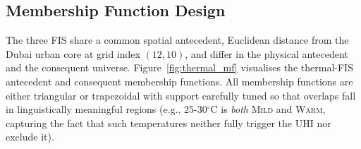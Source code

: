 \documentclass[conference]{IEEEtran}
\begin{document}
\subsection{Membership Function Design}
\label{sec:mf_design}

The three FIS share a common spatial antecedent, Euclidean distance from the Dubai urban core at grid index \((12,10)\), and differ in the physical antecedent and the consequent universe.
Figure~\ref{fig:thermal_mf} visualises the thermal-FIS antecedent and
consequent membership functions.  All membership functions are either
triangular or trapezoidal with support carefully tuned so that overlaps
fall in linguistically meaningful regions (e.g., 25-30\(^{\circ}\)C is
\emph{both} \textsc{Mild} and \textsc{Warm}, capturing the fact that such
temperatures neither fully trigger the UHI nor exclude it).
\end{document}
